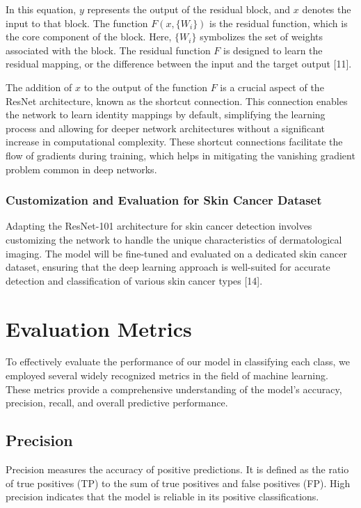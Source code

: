 \documentclass[conference]{IEEEtran}
\begin{document}
In this equation, \( y \) represents the output of the residual block, and \( x \) denotes the input to that block. The function \( F(x, \{W_i\}) \) is the residual function, which is the core component of the block. Here, \( \{W_i\} \) symbolizes the set of weights associated with the block. The residual function \( F \) is designed to learn the residual mapping, or the difference between the input and the target output [11].

The addition of \( x \) to the output of the function \( F \) is a crucial aspect of the ResNet architecture, known as the shortcut connection. This connection enables the network to learn identity mappings by default, simplifying the learning process and allowing for deeper network architectures without a significant increase in computational complexity. These shortcut connections facilitate the flow of gradients during training, which helps in mitigating the vanishing gradient problem common in deep networks.


\subsubsection{Customization and Evaluation for Skin Cancer Dataset}

Adapting the ResNet-101 architecture for skin cancer detection involves customizing the network to handle the unique characteristics of dermatological imaging. The model will be fine-tuned and evaluated on a dedicated skin cancer dataset, ensuring that the deep learning approach is well-suited for accurate detection and classification of various skin cancer types [14].

\section{Evaluation Metrics}

To effectively evaluate the performance of our model in classifying each class, we employed several widely recognized metrics in the field of machine learning. These metrics provide a comprehensive understanding of the model's accuracy, precision, recall, and overall predictive performance.

\subsection{Precision}
Precision measures the accuracy of positive predictions. It is defined as the ratio of true positives (TP) to the sum of true positives and false positives (FP). High precision indicates that the model is reliable in its positive classifications.
\end{document}
